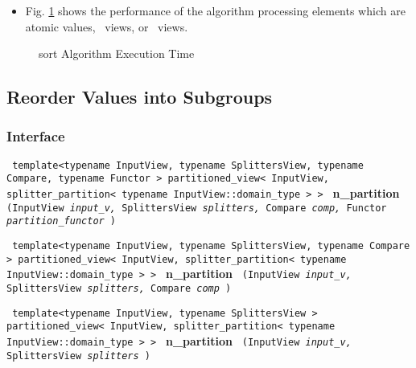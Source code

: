 \begin{itemize}
\item
Fig. \ref{fig:sort-alg-exec-exper}
shows the performance of the algorithm processing
elements which are atomic values, \stl\ views, or \stapl\ views.
\end{itemize}

\begin{figure}[p]
\caption{sort Algorithm Execution Time}
\label{fig:sort-alg-exec-exper}
\end{figure}


\subsection{Reorder Values into Subgroups} \label{sec-sort-n_part}

\subsubsection{Interface} %

\noindent
\texttt{%
template<typename InputView, typename SplittersView, typename Compare, 
    typename Functor > 
\newline
partitioned\_view< InputView, splitter\_partition< typename InputView::domain\_type > > 
}
\newline
\textbf{n\_partition}%
\texttt{%
(InputView 
\textit{input\_v,}%
SplittersView 
\textit{splitters,}%
Compare 
\textit{comp,}%
Functor 
\textit{partition\_functor}%
)
}
\vspace{0.4cm}

\noindent
\texttt{%
template<typename InputView, typename SplittersView, typename Compare >
\newline
partitioned\_view< InputView, splitter\_partition< typename 
    InputView::domain\_type > > 
}
\newline
\textbf{n\_partition}%
\texttt{%
(InputView 
\textit{input\_v,}%
SplittersView 
\textit{splitters,}%
Compare 
\textit{comp}%
)
}
\vspace{0.4cm}

\noindent
\texttt{%
template<typename InputView, typename SplittersView >
\newline
partitioned\_view< InputView, splitter\_partition< typename 
     InputView::domain\_type > > 
}
\newline
\textbf{n\_partition}%
\texttt{%
(InputView 
\textit{input\_v,}%
SplittersView 
\textit{splitters}%
)
}
\vspace{0.4cm}

